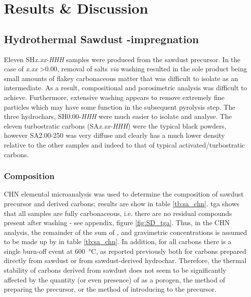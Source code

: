 \newpage

\section{Results \& Discussion}
\subsection[Hydrothermal Sawdust KOH-impregnation]{Hydrothermal Sawdust -impregnation}
\label{ss:sd_results}

Eleven SH\textit{x.xx-HHH} samples were produced from the sawdust precursor. In the case of \textit{x.xx} \num{>0.00}, removal of  salts \textit{via} washing resulted in the sole product being small amounts of flakey carbonaceous matter that was difficult to isolate as an intermediate. As a result, compositional and porosimetric analysis was difficult to achieve. Furthermore, extensive washing appears to remove extremely fine particles which may have some function in the subsequent pyrolysis step. The three \glspl{hydrochar}, SH0.00-\textit{HHH} were much easier to isolate and analyse. The eleven \glspl{turbostratic carbon} (SA\textit{x.xx-HHH}) were the typical black powders, however SA2.00-250 was very diffuse and clearly has a much lower density relative to the other samples and indeed to that of typical activated/\glspl{turbostratic carbon}.

\subsubsection{Composition}

CHN elemental microanalysis was used to determine the composition of sawdust precursor and derived carbons; results are show in table \ref{tb:sa_chn}. \acrshort{tga} shows that all samples are fully carbonaceous, i.e. there are no residual  compounds present after washing - see appendix, figure \ref{fig:SD_tga}. Thus, in the CHN analysis, the remainder of the sum of ,  and  gravimetric concentrations is assumed to be made up by  in table \ref{tb:sa_chn}. In addition, for all carbons there is a single burn-off event at \qty{600}{\degreeCelsius}, as reported previously both for carbons prepared directly from sawdust or from sawdust-derived \gls{hydrochar}.\citep{Balahmar2017Biomass} Therefore, the thermal stability of carbons derived from sawdust does not seem to be significantly affected by the quantity (or even presence) of  as a \gls{porogen}, the method of preparing the precursor, or the method of introducing  to the precursor.

